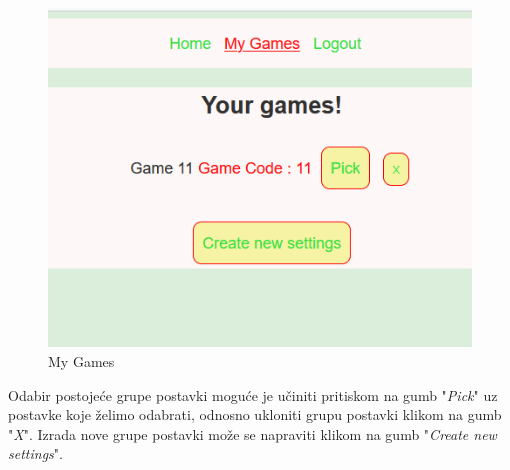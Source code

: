 \documentclass[times, utf8, zavrsni, numeric]{fer}
\begin{document}
		\begin{figure}[H]
			\includegraphics[scale = 0.7]{"slike/izradapostavki.png"} 
			\centering
			\caption{My Games}
			\label{fig:izradapostavki}
		\end{figure}
	
	Odabir postojeće grupe postavki moguće je učiniti pritiskom na gumb "\textit{Pick}" uz postavke koje želimo odabrati, odnosno ukloniti grupu postavki klikom na  gumb "\textit{X}". Izrada nove grupe postavki može se napraviti klikom na gumb
	 "\textit{Create new settings}". 
	 
\end{document}
